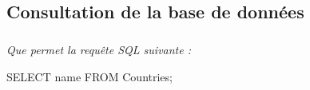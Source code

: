 \documentclass[10pt,fleqn]{article} %
\begin{document}
%
%
%
%
%

\subsection*{Consultation de la base de données}

\subparagraph{}
\textit{Que permet la requête SQL suivante :}
\begin{envsql}
\begin{sql}
SELECT name FROM Countries;
\end{sql}
\end{envsql}
\end{document}
